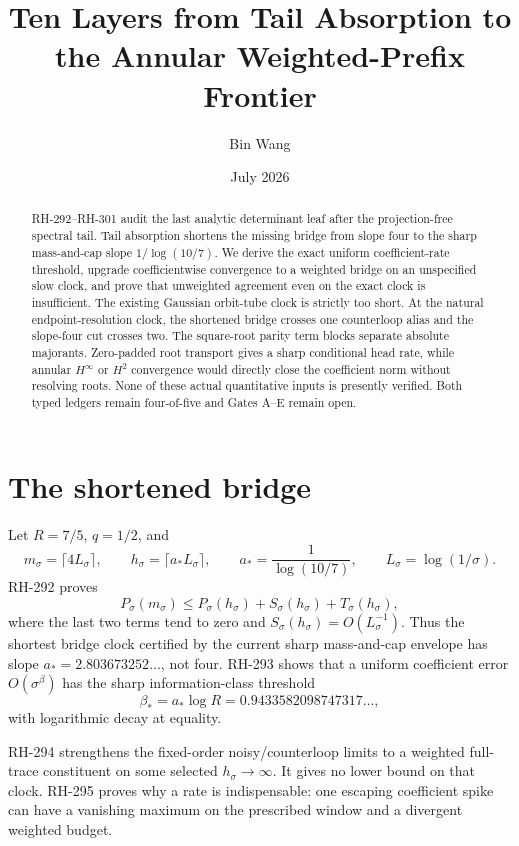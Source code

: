 \documentclass[11pt]{article}
\title{Ten Layers from Tail Absorption to the Annular Weighted-Prefix Frontier}
\author{Bin Wang}\date{July 2026}
\theoremstyle{remark}\newtheorem{remark}[proposition]{Remark}
\begin{document}
\maketitle
\begin{abstract}
RH-292--RH-301 audit the last analytic determinant leaf after the
projection-free spectral tail.  Tail absorption shortens the missing bridge
from slope four to the sharp mass-and-cap slope
$1/\log(10/7)$.  We derive the exact uniform coefficient-rate threshold,
upgrade coefficientwise convergence to a weighted bridge on an unspecified
slow clock, and prove that unweighted agreement even on the exact clock is
insufficient.  The existing Gaussian orbit-tube clock is strictly too short.
At the natural endpoint-resolution clock, the shortened bridge crosses one
counterloop alias and the slope-four cut crosses two.  The square-root parity
term blocks separate absolute majorants.  Zero-padded root transport gives a
sharp conditional head rate, while annular $H^\infty$ or $H^2$ convergence
would directly close the coefficient norm without resolving roots.  None of
these actual quantitative inputs is presently verified.  Both typed ledgers
remain four-of-five and Gates A--E remain open.
\end{abstract}

\section{The shortened bridge}
Let $R=7/5$, $q=1/2$, and
\[
 m_\sigma=\lceil4L_\sigma\rceil,\qquad
 h_\sigma=\lceil a_*L_\sigma\rceil,\qquad
 a_*=\frac1{\log(10/7)},\qquad L_\sigma=\log(1/\sigma).
\]
RH-292 proves
\[
 P_\sigma(m_\sigma)\le
 P_\sigma(h_\sigma)+S_\sigma(h_\sigma)+T_\sigma(h_\sigma),
\]
where the last two terms tend to zero and
$S_\sigma(h_\sigma)=O(L_\sigma^{-1})$.  Thus the shortest bridge clock
certified by the current sharp mass-and-cap envelope has slope
$a_*=2.803673252\ldots$, not four.  RH-293 shows that a uniform coefficient
error $O(\sigma^\beta)$ has the sharp information-class threshold
\[
 \beta_*=a_*\log R=0.9433582098747317\ldots,
\]
with logarithmic decay at equality.

RH-294 strengthens the fixed-order noisy/counterloop limits to a weighted
full-trace constituent on some selected $h_\sigma\to\infty$.  It gives no
lower bound on that clock.  RH-295 proves why a rate is indispensable: one
escaping coefficient spike can have a vanishing maximum on the prescribed
window and a divergent weighted budget.
\end{document}
